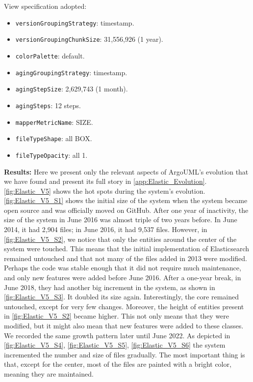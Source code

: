 View specification adopted: 
\begin{itemize}
    \item \texttt{versionGroupingStrategy}: timestamp.
    \item \texttt{versionGroupingChunkSize}: 31,556,926 (1 year). 
    \item \texttt{colorPalette}: default.
    \item \texttt{agingGroupingStrategy}: timestamp.
    \item \texttt{agingStepSize}: 2,629,743 (1 month).
    \item \texttt{agingSteps}: 12 steps.
    \item \texttt{mapperMetricName}: SIZE. 
    \item \texttt{fileTypeShape}: all BOX. 
    \item \texttt{fileTypeOpacity}: all 1. 
\end{itemize}
\bigbreak
\textbf{Results:}
Here we present only the relevant aspects of ArgoUML's evolution that we have found and present its full story in \autoref{app:Elastic_Evolution}. \autoref{fig:Elastic_V5} shows the hot spots during the system's evolution. \autoref{fig:Elastic_V5_S1} shows the initial size of the system when the system became open source and was officially moved on GitHub. After one year of inactivity, the size of the system in June 2016 was almost triple of two years before. In June 2014, it had 2,904 files; in June 2016, it had 9,537 files. However, in \autoref{fig:Elastic_V5_S2}, we notice that only the entities around the center of the system were touched. This means that the initial implementation of Elasticsearch remained untouched and that not many of the files added in 2013 were modified. Perhaps the code was stable enough that it did not require much maintenance, and only new features were added before June 2016. After a one-year break, in June 2018, they had another big increment in the system, as shown in \autoref{fig:Elastic_V5_S3}. It doubled its size again. Interestingly, the core remained untouched, except for very few changes. Moreover, the height of entities present in \autoref{fig:Elastic_V5_S2} became higher. This not only means that they were modified, but it might also mean that new features were added to these classes. We recorded the same growth pattern later until June 2022. As depicted in \autoref{fig:Elastic_V5_S4}, \autoref{fig:Elastic_V5_S5}, \autoref{fig:Elastic_V5_S6} the system incremented the number and size of files gradually. The most important thing is that, except for the center, most of the files are painted with a bright color, meaning they are maintained. 



